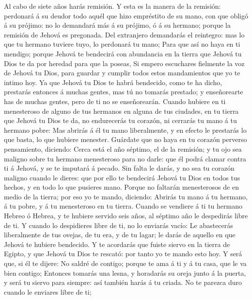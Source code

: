  Al cabo de siete años harás remisión.  Y esta
es la manera de la remisión: perdonará á su deudor todo aquél que hizo
empréstito de su mano, con que obligó á su prójimo: no lo demandará más
á su prójimo, ó á su hermano; porque la remisión de Jehová es pregonada.
 Del extranjero demandarás el reintegro: mas lo que tu
hermano tuviere tuyo, lo perdonará tu mano;  Para que así no
haya en ti mendigo; porque Jehová te bendecirá con abundancia en la
tierra que Jehová tu Dios te da por heredad para que la poseas,
 Si empero escuchares fielmente la voz de Jehová tu Dios,
para guardar y cumplir todos estos mandamientos que yo te intimo hoy.
 Ya que Jehová tu Dios te habrá bendecido, como te ha dicho,
prestarás entonces á muchas gentes, mas tú no tomarás prestado; y
enseñorearte has de muchas gentes, pero de ti no se enseñorearán.
 Cuando hubiere en ti menesteroso de alguno de tus hermanos
en alguna de tus ciudades, en tu tierra que Jehová tu Dios te da, no
endurecerás tu corazón, ni cerrarás tu mano á tu hermano pobre:
 Mas abrirás á él tu mano liberalmente, y en efecto le
prestarás lo que basta, lo que hubiere menester.  Guárdate
que no haya en tu corazón perverso pensamiento, diciendo: Cerca está el
año séptimo, el de la remisión; y tu ojo sea maligno sobre tu hermano
menesteroso para no darle: que él podrá clamar contra ti á Jehová, y se
te imputará á pecado.  Sin falta le darás, y no sea tu
corazón maligno cuando le dieres: que por ello te bendecirá Jehová tu
Dios en todos tus hechos, y en todo lo que pusieres mano. 
Porque no faltarán menesterosos de en medio de la tierra; por eso yo te
mando, diciendo: Abrirás tu mano á tu hermano, á tu pobre, y á tu
menesteroso en tu tierra.  Cuando se vendiere á ti tu
hermano Hebreo ó Hebrea, y te hubiere servido seis años, al séptimo año
le despedirás libre de ti.  Y cuando lo despidieres libre
de ti, no lo enviarás vacío:  Le abastecerás liberalmente
de tus ovejas, de tu era, y de tu lagar; le darás de aquello en que
Jehová te hubiere bendecido.  Y te acordarás que fuiste
siervo en la tierra de Egipto, y que Jehová tu Dios te rescató: por
tanto yo te mando esto hoy.  Y será que, si él te dijere:
No saldré de contigo; porque te ama á ti y á tu casa, que le va bien
contigo;  Entonces tomarás una lesna, y horadarás su oreja
junto á la puerta, y será tu siervo para siempre: así también harás á tu
criada.  No te parezca duro cuando le enviares libre de ti;
